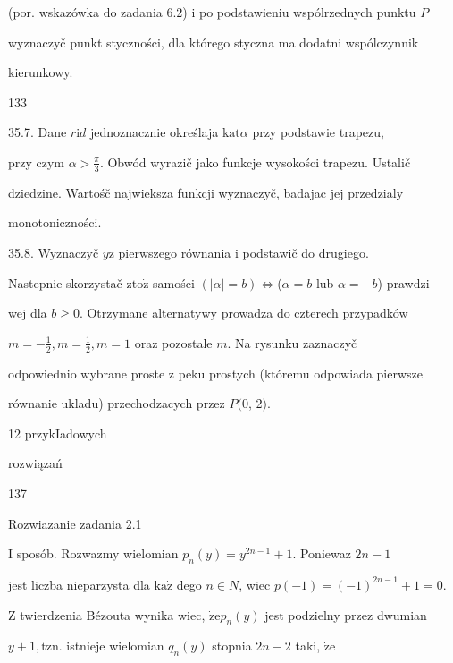 \documentclass[a4paper,12pt]{article}
\begin{document}
(por. wskazówka do zadania 6.2) $\mathrm{i}$ po podstawieniu wspólrzednych punktu $P$

wyznaczyč punkt styczności, dla którego styczna ma dodatni wspólczynnik

kierunkowy.





133

35.7. Dane $r\mathrm{i}d$ jednoznacznie określaja $\mathrm{k}\mathrm{a}\mathrm{t}\alpha$ przy podstawie trapezu,

przy czym $\displaystyle \alpha>\frac{\pi}{3}$. Obwód wyrazič jako funkcje wysokości trapezu. Ustalič

dziedzine. Wartośč najwieksza funkcji wyznaczyč, badajac jej przedzialy

monotoniczności.

35.8. Wyznaczyč $y \mathrm{z}$ pierwszego równania $\mathrm{i}$ podstawič do drugiego.

Nastepnie skorzystač $\mathrm{z}\mathrm{t}\mathrm{o}\dot{\mathrm{z}}$ samości $(|\alpha|=b)\Leftrightarrow$($\alpha=b$ lub $\alpha=-b$) prawdzi-

wej dla $b\geq 0$. Otrzymane alternatywy prowadza do czterech przypadków

$m = -\displaystyle \frac{1}{2}, m = \displaystyle \frac{1}{2}, m = 1$ oraz pozostale $m$. Na rysunku zaznaczyč

odpowiednio wybrane proste $\mathrm{z}$ peku prostych (któremu odpowiada pierwsze

równanie ukladu) przechodzacych przez $P(0$, 2$).$





12  przykIadowych

rozwiązań





137

Rozwiazanie zadania 2.1

I sposób. Rozwazmy wielomian $p_{n}(y) =y^{2n-1}+1$. Poniewaz $2n-1$

jest liczba nieparzysta dla $\mathrm{k}\mathrm{a}\dot{\mathrm{z}}$ dego $n\in N$, wiec $p(-1)=(-1)^{2n-1}+1=0.$

$\mathrm{Z}$ twierdzenia Bézouta wynika wiec, $\dot{\mathrm{z}}\mathrm{e}p_{n}(y)$ jest podzielny przez dwumian

$y+1, \mathrm{t}\mathrm{z}\mathrm{n}$. istnieje wielomian $q_{n}(y)$ stopnia $2n-2$ taki, $\dot{\mathrm{z}}\mathrm{e}$
\end{document}
